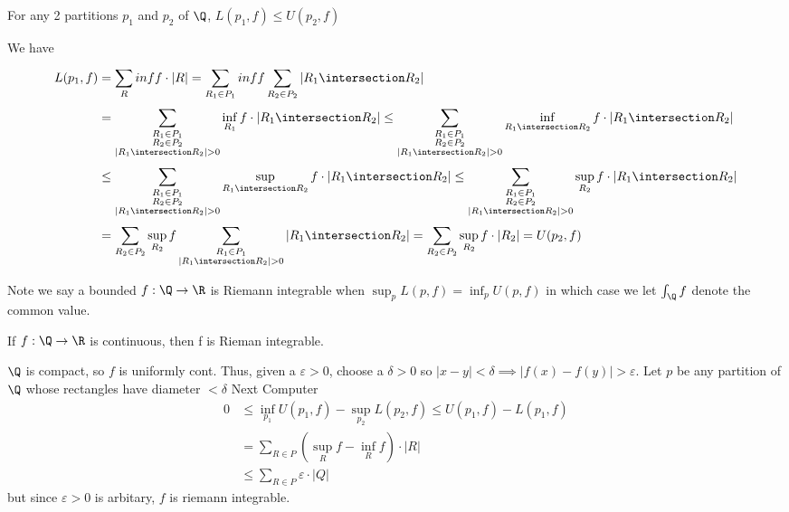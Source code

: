 \begin{lemma}
	For any 2 partitions $p_1$ and $p_2$ of  $\Q$,  $L(p_1,f) \leq U(p_2, f)$
\end{lemma}

\begin{solution}
	We have
	\begin{align*}
		L(p_1, f) &= \sum_{R}^{}  inf f \cdot |R| = \sum_{R_1 \in P_1}^{} inf f 
		\sum_{R_2 \in P_2}^{} |R_1 \intersection R_2 | \\
				  &= \sum_{\substack{R_1 \in P_1 \\ R_2 \in P_2 \\ |R_1 \intersection R_2 | > 0} }^{} \inf_{R_1} f \cdot |R_1 \intersection R_2 | 
				  \leq \sum_{\substack{R_1 \in P_1 \\ R_2 \in P_2 \\ |R_1 \intersection R_2 | > 0} }^{} \inf_{R_1 \intersection R_2} f \cdot |R_1 \intersection R_2 | \\
				  &\leq \sum_{\substack{R_1 \in P_1 \\ R_2 \in P_2 \\ |R_1 \intersection R_2 | > 0} }^{} \sup_{R_1 \intersection R_2} f \cdot |R_1 \intersection R_2 |
				  \leq \sum_{\substack{R_1 \in P_1 \\ R_2 \in P_2 \\ |R_1 \intersection R_2 | > 0} }^{} \sup_{R_2} f \cdot |R_1 \intersection R_2 | \\
				  &= \sum_{R_2 \in P_2}^{} \sup_{R_2} f \sum_{\substack{R_1 \in P_1 \\ |R_1 \intersection R_2 | > 0}}^{} |R_1 \intersection R_2 |  = \sum_{R_2 \in P_2}^{} \sup_{R_2} f \cdot |R_2| = U(p_2, f)
	\end{align*} 
\end{solution}


Note we say a bounded $f : \Q \to \R$ is Riemann integrable when  $\sup_p L(p,f) = \inf_p U(p,f)$ in which case we let  $\int_{\Q} f$ denote the common value.


\begin{theorem}
	If $f : \Q \to \R$	 is continuous, then f is Rieman integrable.
\end{theorem}

\begin{solution}
	$\Q$ is compact, so  $f$ is uniformly cont. Thus, given a $\varepsilon >0 $, choose a $\delta >0$ so  $|x-y| < \delta \implies |f(x) - f(y)| > \varepsilon$. Let $p$ be any partition of  $\Q$ whose rectangles have diameter  $< \delta$ \newline
	Next Computer
	\begin{align*}
		0 &\leq \inf_{p_1} U(p_1, f) - \sup_{p_2} L(p_2, f) \leq U(p_1, f) - L(p_1, f) \\
		  &= \sum_{R \in P}^{} \left( \sup_{R} f - \inf_{R}f \right) \cdot |R| \\ 
		  &\leq \sum_{R \in P}^{} \varepsilon \cdot |Q|
	\end{align*}
	but since $\varepsilon > 0$ is arbitary,  $f$ is riemann integrable.
\end{solution}

